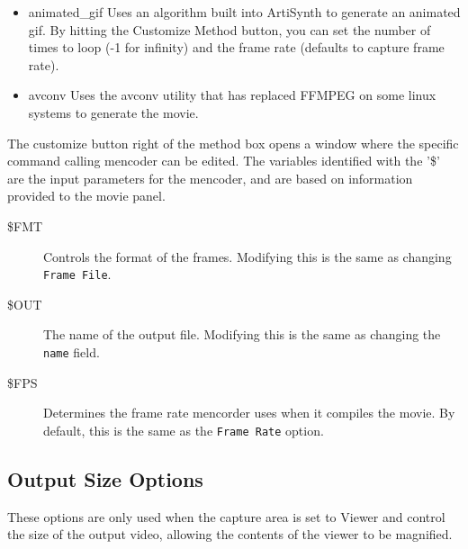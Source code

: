 \documentclass{article}
\begin{document}
\begin{description}
\begin{itemize}
\item {\sf animated\_gif} Uses an algorithm built into ArtiSynth to
generate an animated gif.  By hitting the {\sf Customize Method}
button, you can set the number of times to loop (-1 for infinity)
and the frame rate (defaults to capture frame rate).

\item {\sf avconv} Uses the avconv utility that has replaced
FFMPEG on some linux systems to generate the movie.

\end{itemize}

\end{description}

The customize button right of the method box opens a window where the
specific command calling mencoder can be edited. The variables
identified with the '\$' are the input parameters for the mencoder,
and are based on information provided to the movie panel.

\begin{description}

\item[\$FMT]\mbox{}

Controls the format of the frames. Modifying this is the same as
changing {\tt Frame File}.

\item[\$OUT]\mbox{}
 
The name of the output file. Modifying this is the same as
changing the {\tt name} field.

\item[\$FPS]\mbox{}

Determines the frame rate mencorder uses when it compiles the
movie. By default, this is the same as the {\tt Frame Rate} option.

\end{description}

\subsection{Output Size Options}

These options are only used when the capture area is set to {\sf Viewer} and
control the size of the output video, allowing the contents of the viewer
to be magnified.
\end{document}
